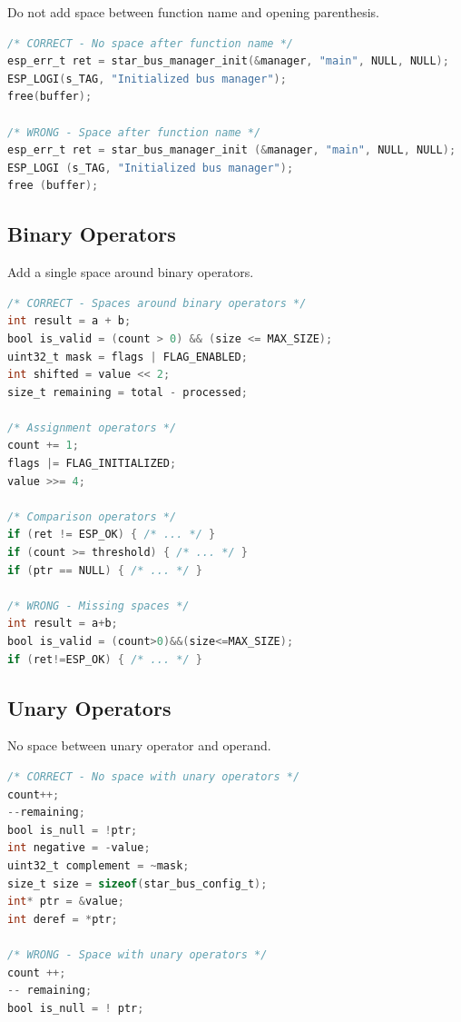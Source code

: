 Do not add space between function name and opening parenthesis.

\begin{lstlisting}[language=C]
/* CORRECT - No space after function name */
esp_err_t ret = star_bus_manager_init(&manager, "main", NULL, NULL);
ESP_LOGI(s_TAG, "Initialized bus manager");
free(buffer);

/* WRONG - Space after function name */
esp_err_t ret = star_bus_manager_init (&manager, "main", NULL, NULL);
ESP_LOGI (s_TAG, "Initialized bus manager");
free (buffer);
\end{lstlisting}

\subsection{Binary Operators}

Add a single space around binary operators.

\begin{lstlisting}[language=C]
/* CORRECT - Spaces around binary operators */
int result = a + b;
bool is_valid = (count > 0) && (size <= MAX_SIZE);
uint32_t mask = flags | FLAG_ENABLED;
int shifted = value << 2;
size_t remaining = total - processed;

/* Assignment operators */
count += 1;
flags |= FLAG_INITIALIZED;
value >>= 4;

/* Comparison operators */
if (ret != ESP_OK) { /* ... */ }
if (count >= threshold) { /* ... */ }
if (ptr == NULL) { /* ... */ }

/* WRONG - Missing spaces */
int result = a+b;
bool is_valid = (count>0)&&(size<=MAX_SIZE);
if (ret!=ESP_OK) { /* ... */ }
\end{lstlisting}

\subsection{Unary Operators}

No space between unary operator and operand.

\begin{lstlisting}[language=C]
/* CORRECT - No space with unary operators */
count++;
--remaining;
bool is_null = !ptr;
int negative = -value;
uint32_t complement = ~mask;
size_t size = sizeof(star_bus_config_t);
int* ptr = &value;
int deref = *ptr;

/* WRONG - Space with unary operators */
count ++;
-- remaining;
bool is_null = ! ptr;
\end{lstlisting}

